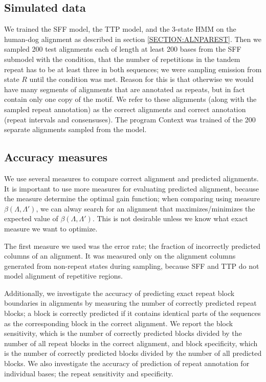 \subsection{Simulated data}
We trained the SFF model, the TTP model, and the 3-state HMM on the human-dog
alignment as described in section \ref{SECTION:ALNPAREST}. Then we sampled 200
test alignments each of length at least 200 bases from the SFF submodel with
the condition, that the number of repetitions in the tandem repeat has to be at
least three in both sequences; we were sampling emission from state $R$ until
the condition was met.  Reason for this is that otherwise we would have many
segments of alignments that are annotated as repeats, but in fact contain only
one copy of the motif. We refer to these alignments (along with the sampled
repeat annotation) as the correct alignments and correct annotation (repeat
intervals and consensuses).  The program Context \cite{Hickey2011} was trained
of the 200 separate alignments sampled from the model.

\subsection{Accuracy measures}
We use several measures to compare correct alignment and predicted alignments.
It is important to use more measures for evaluating predicted alignment,
because the measure determine the optimal gain function; when comparing using
measure $\beta(\Lambda, \Lambda')$, we can alway search for an alignment that
maximizes/minimizes the expected value of $\beta(\Lambda, \Lambda')$. This is
not desirable unless we know what exact measure we want to optimize. 

The first measure we used was the error rate; the fraction of incorrectly
predicted columns of an alignment. It was measured only on the alignment
columns generated from non-repeat states during sampling, because SFF and TTP
do not model alignment of repetitive regions.

Additionally, we investigate the accuracy of predicting exact repeat block
boundaries in alignments by measuring the number of correctly predicted repeat
blocks; a block is correctly predicted if it contains identical parts of the
sequences as the corresponding block in the correct alignment. We report the
block sensitivity, which is the number of correctly predicted blocks divided by
the number of all repeat blocks in the correct alignment, and block
specificity, which is the number of correctly predicted blocks divided by
the number of all predicted blocks.  We also investigate the accuracy of
prediction of repeat annotation for individual bases; the repeat sensitivity and specificity.


